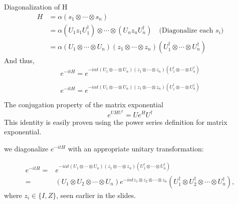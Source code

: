 \documentclass[aspectratio=169,xcolor=dvipsnames]{beamer}
\begin{document}
\begin{frame}{Diagonalization of H}
  \begin{align*}
    H &= \alpha (s_1 \otimes \cdots \otimes s_n) \\
      &= \alpha (U_1 z_1 U_1^\dagger) \otimes \cdots \otimes (U_n z_n U_n^\dagger) \quad \text{(Diagonalize each $s_i$)} \\
      &= \alpha (U_1 \otimes \cdots \otimes U_n)(z_1 \otimes \cdots \otimes z_n)(U_1^\dagger \otimes \cdots \otimes U_n^\dagger)
  \end{align*}
  And thus, 
  \begin{equation*}
    e^{-i t H} = e^{-i \alpha t (U_1 \otimes \cdots \otimes U_n)(z_1 \otimes \cdots \otimes z_n)(U_1^\dagger \otimes \cdots \otimes U_n^\dagger)}
  \end{equation*}

\end{frame}



\begin{frame}

    \begin{equation*}
    e^{-i t H} = e^{-i \alpha t (U_1 \otimes \cdots \otimes U_n)(z_1 \otimes \cdots \otimes z_n)(U_1^\dagger \otimes \cdots \otimes U_n^\dagger)}
  \end{equation*}

  \begin{block}{The conjugation property of the matrix exponential}
    \begin{equation*}
      e^{U H U^{\dagger}} = U e^{H} U^{\dagger}
    \end{equation*}
    This identity is easily proven using the power series definition for matrix exponential. 
  \end{block}

  we diagonalize $e^{-i t H}$ with an appropriate unitary transformation:

  \begin{equation*}
    \begin{align*}
    e^{-i t H} =& e^{-i \alpha t (U_1 \otimes \cdots \otimes U_n)(z_1 \otimes \cdots \otimes z_n)(U_1^\dagger \otimes \cdots \otimes U_n^\dagger)}\\
    =& (U_1 \otimes U_2 \otimes \cdots \otimes U_n) e^{-i \alpha t z_1 \otimes z_2 \otimes \cdots \otimes z_n} (U_1^{\dagger} \otimes U_2^{\dagger} \otimes \cdots \otimes U_n^{\dagger}),
    \end{align*}
  \end{equation*}
  where $z_i \in \{I, Z\}$, seen earlier in the slides.
\end{frame}
\end{document}
